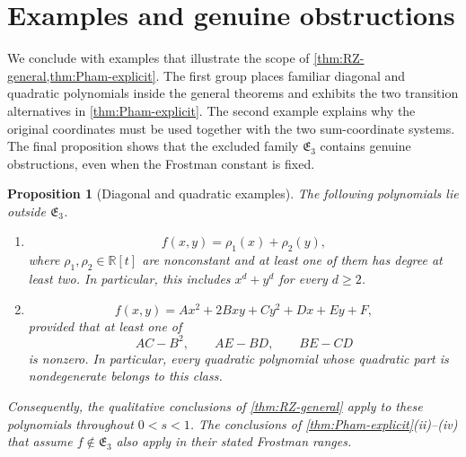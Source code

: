 \documentclass[11pt]{article}
\newtheorem{proposition}[theorem]{Proposition}
\begin{document}
\section{Examples and genuine obstructions}
\label{sec:examples-obstructions}

We conclude with examples that illustrate the scope of
\cref{thm:RZ-general,thm:Pham-explicit}.  The first group places
familiar diagonal and quadratic polynomials inside the general
theorems and exhibits the two transition alternatives in
\cref{thm:Pham-explicit}.  The second example explains why the
original coordinates must be used together with the two sum-coordinate
systems.  The final proposition shows that the excluded family
\(\mathfrak E_3\) contains genuine obstructions, even when the
Frostman constant is fixed.

\begin{proposition}[Diagonal and quadratic examples]
\label{prop:diagonal-quadratic-examples}
The following polynomials lie outside \(\mathfrak E_3\).
\begin{enumerate}[label=\textup{(\roman*)}]
\item
\begin{equation}
 f(x,y)=\rho_1(x)+\rho_2(y),
 \label{eq:diagonal-example}
\end{equation}
where \(\rho_1,\rho_2\in\mathbb R[t]\) are nonconstant and at least one of
them has degree at least two.  In particular, this includes
\(x^d+y^d\) for every \(d\ge2\).

\item
\begin{equation}
 f(x,y)=Ax^2+2Bxy+Cy^2+Dx+Ey+F,
 \label{eq:quadratic-example}
\end{equation}
provided that at least one of
\begin{equation}
 AC-B^2,\qquad AE-BD,\qquad BE-CD
 \label{eq:quadratic-example-minors}
\end{equation}
is nonzero.  In particular, every quadratic polynomial whose
quadratic part is nondegenerate belongs to this class.
\end{enumerate}
Consequently, the qualitative conclusions of
\cref{thm:RZ-general} apply to these polynomials throughout
\(0<s<1\).  The conclusions of
\cref{thm:Pham-explicit}\textup{(ii)--(iv)} that assume
\(f\notin\mathfrak E_3\) also apply in their stated Frostman ranges.
\end{proposition}
\end{document}
